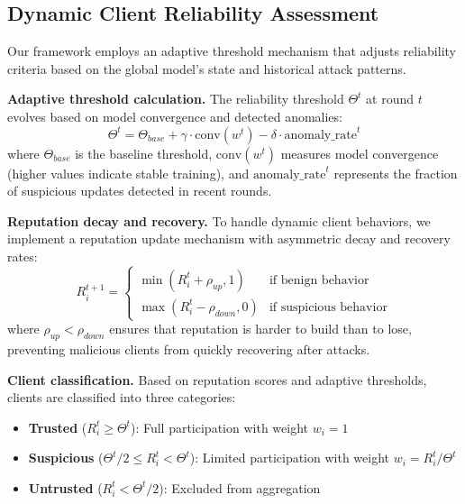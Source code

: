\documentclass[lettersize,journal]{IEEEtran}
\begin{document}
{%




\subsection{Dynamic Client Reliability Assessment}\label{ssub:Dynamic Client Reliability Assessment}

Our framework employs an adaptive threshold mechanism that adjusts reliability criteria based on the global model's state and historical attack patterns.

\textbf{Adaptive threshold calculation.} The reliability threshold $\Theta^t$ at round $t$ evolves based on model convergence and detected anomalies:
\begin{equation}\label{eq:Adaptive threshold calculation}
\Theta^t = \Theta_{base} + \gamma \cdot \text{conv}(w^t) - \delta \cdot \text{anomaly\_rate}^t
\end{equation}
where $\Theta_{base}$ is the baseline threshold, $\text{conv}(w^t)$ measures model convergence (higher values indicate stable training), and $\text{anomaly\_rate}^t$ represents the fraction of suspicious updates detected in recent rounds.

\textbf{Reputation decay and recovery.} To handle dynamic client behaviors, we implement a reputation update mechanism with asymmetric decay and recovery rates:
\begin{equation}
R_i^{t+1} = \begin{cases}
\min(R_i^t + \rho_{up}, 1) & \text{if benign behavior} \\
\max(R_i^t - \rho_{down}, 0) & \text{if suspicious behavior}
\end{cases}
\end{equation}
where $\rho_{up} < \rho_{down}$ ensures that reputation is harder to build than to lose, preventing malicious clients from quickly recovering after attacks.

\textbf{Client classification.} Based on reputation scores and adaptive thresholds, clients are classified into three categories:
\begin{itemize}[wide]
    \item \textbf{Trusted} ($R_i^t \geq \Theta^t$): Full participation with weight $w_i = 1$
    \item \textbf{Suspicious} ($\Theta^t/2 \leq R_i^t < \Theta^t$): Limited participation with weight $w_i = R_i^t/\Theta^t$
    \item \textbf{Untrusted} ($R_i^t < \Theta^t/2$): Excluded from aggregation
\end{itemize}

}
\end{document}
